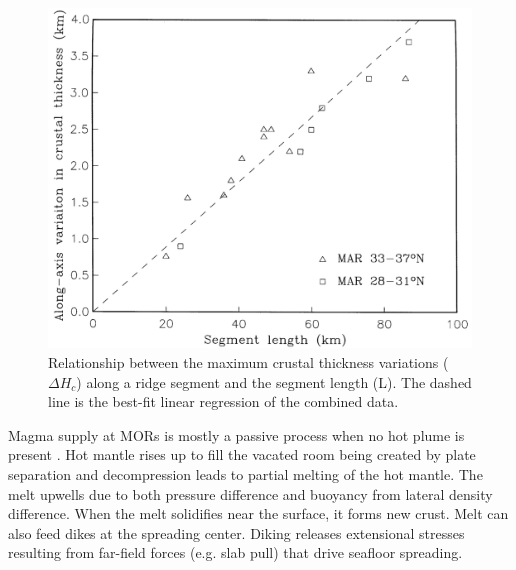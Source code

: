 \begin{figure}[H]
 \centering
  \includegraphics[scale=0.3]{./Figures/fig_Intro3_1.png}
 \caption{\small{Relationship between the maximum crustal thickness variations ($\Delta H_{c}$) along a ridge segment and the segment length (L). The dashed line is the best-fit linear regression of the combined data. \citep{Chen1999}}}
 \label{fig_Intro3_1}
\end{figure}

%

Magma supply at MORs is mostly a passive process when no hot plume is present \citep{Fowler2004}. Hot mantle rises up to fill the vacated room being created by plate separation and decompression leads to partial melting of the hot mantle. The melt upwells due to both pressure difference and buoyancy from lateral density difference. When the melt solidifies near the surface, it forms new crust. Melt can also feed dikes at the spreading center. Diking releases extensional stresses resulting from far-field forces (e.g. slab pull) that drive seafloor spreading.

